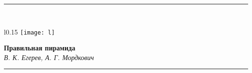 \hspace*{-1.4cm}\noindent\rule{16.2cm}{0.4pt}\vspace*{1cm}\\
\begin{wrapfigure}[3]{l}{0.15\textwidth}
\vspace*{-1.7cm}\hspace*{1cm}\texttt{[image: l]}
\end{wrapfigure}
\hspace*{1.5cm}\Huge\textbf{ Правильная пирамида}\\
\newline\vspace*{1cm}
\hspace*{1.5cm}\normalsize\textit{В. К. Егерев, А. Г. Мордкович}\\
\hspace*{-0.9cm}\noindent\rule{16.2cm}{0.4pt}\\
\vspace*{-0.7cm}

